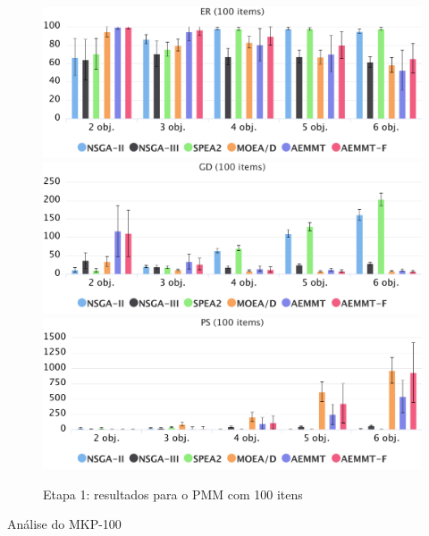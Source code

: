 \begin{figure}[!htbp]
	\caption{Etapa 1: resultados para o PMM com 100 itens}
	\label{fig_exp1_mkp_100}
	\includegraphics[width=1\textwidth]{cap_experimentos/figs/etapa1/er-mkp-100}
	\includegraphics[width=1\textwidth]{cap_experimentos/figs/etapa1/gd-mkp-100}
	\includegraphics[width=1\textwidth]{cap_experimentos/figs/etapa1/ps-mkp-100}
\end{figure}

Análise do MKP-100

